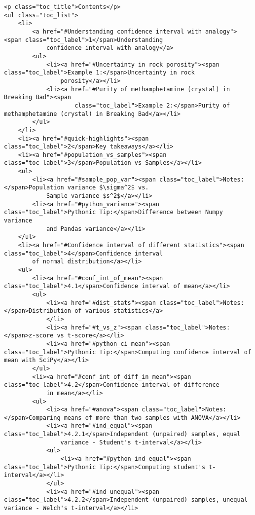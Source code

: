 \documentclass[11pt]{article}
\begin{document}
    \hypertarget{toc_container}{}
\begin{verbatim}
<p class="toc_title">Contents</p>
<ul class="toc_list">
    <li>
        <a href="#Understanding confidence interval with analogy"><span class="toc_label">1</span>Understanding
            confidence interval with analogy</a>
        <ul>
            <li><a href="#Uncertainty in rock porosity"><span class="toc_label">Example 1:</span>Uncertainty in rock
                porosity</a></li>
            <li><a href="#Purity of methamphetamine (crystal) in Breaking Bad"><span
                    class="toc_label">Example 2:</span>Purity of methamphetamine (crystal) in Breaking Bad</a></li>
        </ul>
    </li>
    <li><a href="#quick-highlights"><span class="toc_label">2</span>Key takeaways</a></li>
    <li><a href="#population_vs_samples"><span class="toc_label">3</span>Population vs Samples</a></li>
    <ul>
        <li><a href="#sample_pop_var"><span class="toc_label">Notes:</span>Population variance $\sigma^2$ vs.
            Sample variance $s^2$</a></li>
        <li><a href="#python_variance"><span class="toc_label">Pythonic Tip:</span>Difference between Numpy variance
            and Pandas variance</a></li>
    </ul>
    <li><a href="#Confidence interval of different statistics"><span class="toc_label">4</span>Confidence interval
        of normal distribution</a></li>
    <ul>
        <li><a href="#conf_int_of_mean"><span class="toc_label">4.1</span>Confidence interval of mean</a></li>
        <ul>
            <li><a href="#dist_stats"><span class="toc_label">Notes:</span>Distribution of various statistics</a>
            </li>
            <li><a href="#t_vs_z"><span class="toc_label">Notes:</span>z-score vs t-score</a></li>
            <li><a href="#python_ci_mean"><span class="toc_label">Pythonic Tip:</span>Computing confidence interval of mean with SciPy</a></li>
        </ul>
        <li><a href="#conf_int_of_diff_in_mean"><span class="toc_label">4.2</span>Confidence interval of difference
            in mean</a></li>
        <ul>
            <li><a href="#anova"><span class="toc_label">Notes:</span>Comparing means of more than two samples with ANOVA</a></li>
            <li><a href="#ind_equal"><span class="toc_label">4.2.1</span>Independent (unpaired) samples, equal
                variance - Student's t-interval</a></li>
            <ul>
                <li><a href="#python_ind_equal"><span class="toc_label">Pythonic Tip:</span>Computing student's t-interval</a></li>
            </ul>
            <li><a href="#ind_unequal"><span class="toc_label">4.2.2</span>Independent (unpaired) samples, unequal variance - Welch's t-interval</a></li>

\end{verbatim}
\end{document}
